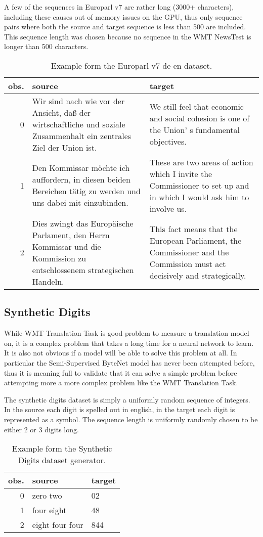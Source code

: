 A few of the sequences in Europarl v7 are rather long (3000+ characters), including these causes out of memory issues on the GPU, thus only sequence pairs where both the source and target sequence is less than 500 are included. This sequence length was chosen because no sequence in the WMT NewsTest is longer than 500 characters. 

\begin{table}[H]
\centering
\begin{tabular}{r|p{5cm} p{5cm}}
	obs. & source & target\\ \hline
        0 & Wir sind nach wie vor der Ansicht, daß der wirtschaftliche und soziale Zusammenhalt ein zentrales Ziel der Union ist. & We still feel that economic and social cohesion is one of the Union' s fundamental objectives. \\
        1 & Den Kommissar möchte ich auffordern, in diesen beiden Bereichen tätig zu werden und uns dabei mit einzubinden. & These are two areas of action which I invite the Commissioner to set up and in which I would ask him to involve us. \\
        2  & Dies zwingt das Europäische Parlament, den Herrn Kommissar und die Kommission zu entschlossenem strategischen Handeln. & This fact means that the European Parliament, the Commissioner and the Commission must act decisively and strategically.
\end{tabular}
\caption{Example form the Europarl v7 de-en dataset.}
\end{table}

\subsection{Synthetic Digits}

While WMT Translation Task is good problem to measure a translation model on, it is a complex problem that takes a long time for a neural network to learn. It is also not obvious if a model will be able to solve this problem at all. In particular the Semi-Supervised ByteNet model has never been attempted before, thus it is meaning full to validate that it can solve a simple problem before attempting more a more complex problem like the WMT Translation Task.

The synthetic digits dataset is simply a uniformly random sequence of integers. In the source each digit is spelled out in english, in the target each digit is represented as a symbol. The sequence length is uniformly randomly chosen to be either 2 or 3 digits long.
\begin{table}[H]
\centering
\begin{tabular}{r|p{5cm} p{5cm}}
	obs. & source & target\\ \hline
	0 & zero two & 02 \\
    1 & four eight & 48 \\
    2 & eight four four & 844
\end{tabular}
\caption{Example form the Synthetic Digits dataset generator.}
\end{table}
